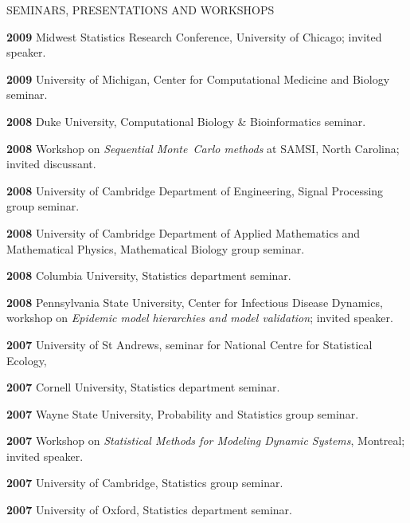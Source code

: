 \begin{mylist}{SEMINARS, PRESENTATIONS AND WORKSHOPS}
\item{\bf 2009 } Midwest Statistics Research Conference, University of Chicago;  invited speaker.

\item{\bf 2009 } University of Michigan, Center for Computational Medicine and Biology seminar.


\item{\bf 2008 } Duke University, Computational Biology \& Bioinformatics seminar.

\item{\bf 2008 } Workshop on {\it Sequential Monte~Carlo methods} at SAMSI, North Carolina; invited discussant.

\item{\bf 2008 } University of Cambridge Department of Engineering, Signal Processing group seminar.

\item{\bf 2008 } University of Cambridge Department of Applied Mathematics and Mathematical Physics, Mathematical Biology group seminar.

\item{\bf 2008 } Columbia University, Statistics department seminar.

\item{\bf 2008 } Pennsylvania State University, Center for Infectious Disease Dynamics, workshop on {\it Epidemic model hierarchies and model validation}; invited speaker.

\item{\bf 2007 } University of St Andrews, seminar for National Centre for Statistical Ecology, 

\item{\bf 2007 } Cornell University, Statistics department seminar.

\item{\bf 2007 } Wayne State University, Probability and Statistics group seminar.
 	
\item{\bf 2007 }  Workshop on {\it Statistical Methods for Modeling Dynamic Systems}, Montreal; invited speaker.

\item{\bf 2007 } University of Cambridge, Statistics group seminar.

\item{\bf 2007 } University of Oxford, Statistics department seminar.



\end{mylist}
